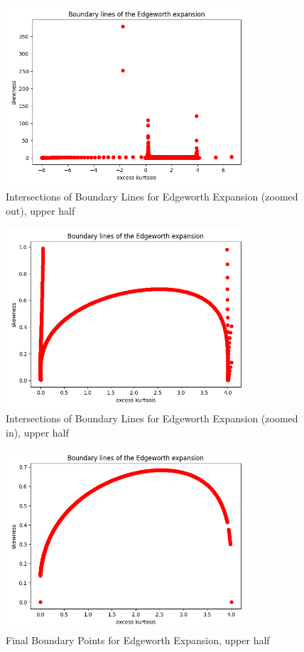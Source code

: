 \begin{figure}[h]
    \centering
    \includegraphics[width=0.8\textwidth]{img/edgeworth_positivity_boundary_intersections_3.png}
    \caption{Intersections of Boundary Lines for Edgeworth Expansion (zoomed out), upper half}
    \label{fig:ew_boundary_intersections_3}
\end{figure}
\begin{figure}[h]
    \centering
    \includegraphics[width=0.8\textwidth]{img/edgeworth_positivity_boundary_intersections_4.png}
    \caption{Intersections of Boundary Lines for Edgeworth Expansion (zoomed in), upper half}
    \label{fig:ew_boundary_intersections_4}
\end{figure}
\begin{figure}[h]
    \centering
    \includegraphics[width=0.8\textwidth]{img/edgeworth_positivity_boundary_intersections_7.png}
    \caption{Final Boundary Points for Edgeworth Expansion, upper half}
    \label{fig:ew_boundary_intersections_7}
\end{figure}

